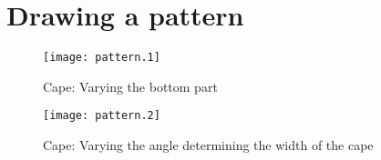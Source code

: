 \documentclass{article}
\begin{document}
\section*{Drawing a pattern}

\begin{figure}[htb]
\begin{center}
\texttt{[image: pattern.1]}
\caption{Cape: Varying the bottom part}
\end{center}
\end{figure}

\begin{figure}[htb]
\begin{center}
\texttt{[image: pattern.2]}
\caption{Cape: Varying the angle determining the width of the cape}
\end{center}
\end{figure}
\end{document}
